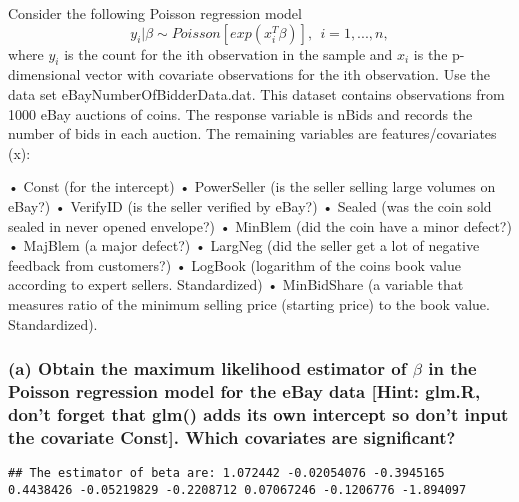 \documentclass[]{article}
\begin{document}
Consider the following Poisson regression model
\[ y_i | \beta \sim Poisson[exp (x^T_i \beta)] , \ \ i = 1, ..., n,\]
where \(y_i\) is the count for the ith observation in the sample and
\(x_i\) is the p-dimensional vector with covariate observations for the
ith observation. Use the data set eBayNumberOfBidderData.dat. This
dataset contains observations from 1000 eBay auctions of coins. The
response variable is nBids and records the number of bids in each
auction. The remaining variables are features/covariates (x):

• Const (for the intercept) • PowerSeller (is the seller selling large
volumes on eBay?) • VerifyID (is the seller verified by eBay?) • Sealed
(was the coin sold sealed in never opened envelope?) • MinBlem (did the
coin have a minor defect?) • MajBlem (a major defect?) • LargNeg (did
the seller get a lot of negative feedback from customers?) • LogBook
(logarithm of the coins book value according to expert sellers.
Standardized) • MinBidShare (a variable that measures ratio of the
minimum selling price (starting price) to the book value. Standardized).

\hypertarget{a-obtain-the-maximum-likelihood-estimator-of-beta-in-the-poisson-regression-model-for-the-ebay-data-hint-glm.r-dont-forget-that-glm-adds-its-own-intercept-so-dont-input-the-covariate-const.-which-covariates-are-significant}{%
\subsubsection{\texorpdfstring{(a) Obtain the maximum likelihood
estimator of \(\beta\) in the Poisson regression model for the eBay data
{[}Hint: glm.R, don't forget that glm() adds its own intercept so don't
input the covariate Const{]}. Which covariates are
significant?}{(a) Obtain the maximum likelihood estimator of \textbackslash beta in the Poisson regression model for the eBay data {[}Hint: glm.R, don't forget that glm() adds its own intercept so don't input the covariate Const{]}. Which covariates are significant?}}\label{a-obtain-the-maximum-likelihood-estimator-of-beta-in-the-poisson-regression-model-for-the-ebay-data-hint-glm.r-dont-forget-that-glm-adds-its-own-intercept-so-dont-input-the-covariate-const.-which-covariates-are-significant}}

\begin{verbatim}
## The estimator of beta are: 1.072442 -0.02054076 -0.3945165 0.4438426 -0.05219829 -0.2208712 0.07067246 -0.1206776 -1.894097
\end{verbatim}
\end{document}
